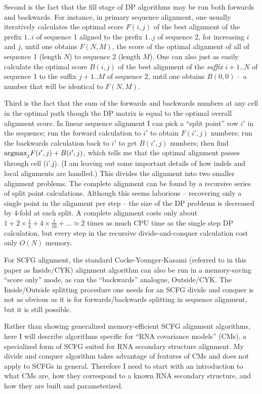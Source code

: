 \documentclass[11pt]{article}
\begin{document}
Second is the fact that the fill stage of DP algorithms may be run
both forwards and backwards. For instance, in primary sequence
alignment, one usually iteratively calculates the optimal score
$F(i,j)$ of the best alignment of the prefix $1..i$ of sequence 1
aligned to the prefix $1..j$ of sequence 2, for increasing $i$ and
$j$, until one obtains $F(N,M)$, the score of the optimal alignment of
all of sequence 1 (length $N$) to sequence 2 (length $M$). One can
also just as easily calculate the optimal score $B(i,j)$ of the best
alignment of the
\emph{suffix} $i+1..N$ of sequence 1 to the suffix $j+1..M$ of sequence 2,
until one obtains $B(0,0)$ -- a number that will be identical to
$F(N,M)$.

Third is the fact that the sum of the forwards and backwards numbers
at any cell in the optimal path though the DP matrix is equal to the
optimal overall alignment score. In linear sequence alignment I can
pick a ``split point'' row $i'$ in the sequence; run the forward
calculation to $i'$ to obtain $F(i',j)$ numbers; run the backwards
calculation back to $i'$ to get $B(i',j)$ numbers; then find
$\mbox{\rm{argmax}}_j F(i',j) + B(i',j)$, which tells me that the optimal
alignment passes through cell (i',j). (I am leaving out some important
details of how indels and local alignments are handled.) This divides
the alignment into two smaller alignment problems. The complete
alignment can be found by a recursive series of split point
calculations. Although this seems laborious -- recovering only a
single point in the alignment per step -- the size of the DP problems
is decreased by 4-fold at each split. A complete alignment costs only
about $1 + 2 \times \frac{1}{4} + 4 \times \frac{1}{16} + \ldots
\simeq 2$ times as much CPU time as the single step DP calculation,
but every step in the recursive divide-and-conquer calculation cost
only $O(N)$ memory.

For SCFG alignment, the standard Cocke-Younger-Kasami (referred to in
this paper as Inside/CYK) alignment algorithm can also be run in a
memory-saving ``score only'' mode, as can the ``backwards'' analogue,
Outside/CYK. The Inside/Outside splitting procedure one needs for an
SCFG divide and conquer is not as obvious as it is for
forwards/backwards splitting in sequence alignment, but it is still
possible.

Rather than showing generalized memory-efficient SCFG alignment
algorithms, here I will describe algorithms specific for ``RNA
covariance models'' (CMs), a specialized form of SCFG suited for RNA
secondary structure alignment. My divide and conquer algorithm takes
advantage of features of CMs and does not apply to SCFGs in
general. Therefore I need to start with an introduction to what CMs
are, how they correspond to a known RNA secondary structure, and how
they are built and parameterized.
      
\end{document}
